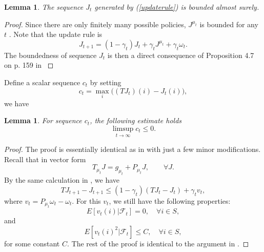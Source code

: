 \documentclass[12pt,a4paper]{amsart}
\numberwithin{equation}{section}
\theoremstyle{plain}
\newtheorem{Lemma}[Th]{Lemma}
\theoremstyle{definition}
\begin{document}
\begin{Lemma}\label{lmbounded}
	The sequence $J_t$ generated by (\ref{updaterule}) is bounded almost surely. 
\end{Lemma}
\begin{proof} Since there are only finitely many possible policies, $J^{\mu_t}$ is bounded for any $t$ . Note that the update rule is
$$
J_{t+1} = (1-\gamma_t) J_t + \gamma_t J^{\mu_t} +\gamma_t \omega_t.
$$
The boundedness of sequence $J_t$ is then a direct consequence of Proposition 4.7 on p. 159 in \cite{BertsekasTsitsiklis96}
\end{proof}

Define a scalar sequence $c_t$ by setting
\begin{equation} \label{dfct}
	c_t = \max_{i} \big((TJ_t)(i) - J_t(i)\big),
\end{equation}
we have 
\begin{Lemma} \label{lmct}
	For sequence $c_t$, the following estimate holds
	$$
	\limsup_{t \to \infty} c_t \leq 0.
	$$
\end{Lemma}
\begin{proof}
	The proof is essentially identical as in \cite{Ts03} with just a few minor modifications. Recall that in vector form 
	$$
	T_{\mu_t} J = g_{\mu_t} + P_{\mu_t} J, \qquad \forall J.
	$$
	By the same calculation in \cite{Ts03}, we have 
	$$
	TJ_{t+1} - J_{t+1} \leq (1-\gamma_t) (TJ_t - J_t) + \gamma_t v_t,
	$$
	where $v_t = P_{\mu_t} \omega_t - \omega_t$. For this $v_t$, we still have the following properties:
	$$
	E\left[ v_t(i) | \mathcal{F}_t \right] = 0, \quad  \forall i \in S,
	$$
	and 
	$$
	E\left[ v_t(i)^2 | \mathcal{F}_t \right]  \leq C, \quad \forall i \in S,
	$$
	for some constant $C$.  The rest of the proof is identical to the argument in \cite{Ts03}.
\end{proof}
\end{document}
